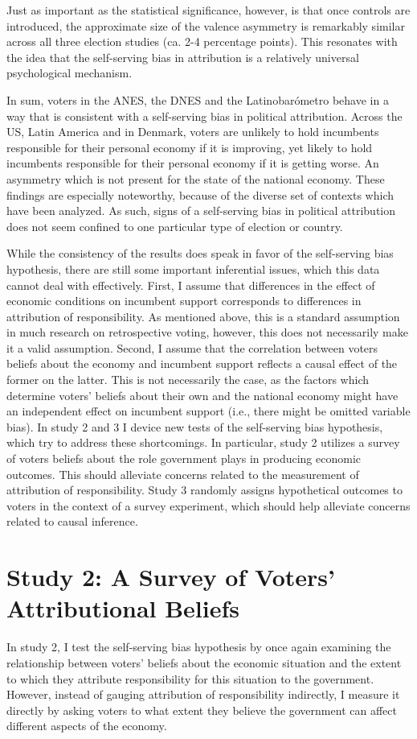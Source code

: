 \documentclass[a4paper,11pt]{article}
\begin{document}
	Just as important as the statistical significance, however, is that once controls are introduced, the approximate size of the valence asymmetry is remarkably similar across all three election studies (ca. 2-4 percentage points). This resonates with the idea that the self-serving bias in attribution is a relatively universal psychological mechanism.
	
	In sum, voters in the ANES, the DNES and the Latinobarómetro behave in a way that is consistent with a self-serving bias in political attribution. Across the US, Latin America and in Denmark, voters are unlikely to hold incumbents responsible for their personal economy if it is improving, yet likely to hold incumbents responsible for their personal economy if it is getting worse. An asymmetry which is not present for the state of the national economy. These findings are especially noteworthy, because of the diverse set of contexts which have been analyzed. As such, signs of a self-serving bias in political attribution does not seem confined to one particular type of election or country. 
	
	While the consistency of the results does speak in favor of the self-serving bias hypothesis, there are still some important inferential issues, which this data cannot deal with effectively. First, I assume that differences in the effect of economic conditions on incumbent support corresponds to differences in attribution of responsibility. As mentioned above, this is a standard assumption in much research on retrospective voting, however, this does not necessarily make it a valid assumption. Second, I assume that the correlation between voters beliefs about the economy and incumbent support reflects a causal effect of the former on the latter. This is not necessarily the case, as the factors which determine voters' beliefs about their own and the national economy might have an independent effect on incumbent support (i.e., there might be omitted variable bias). In study 2 and 3 I device new tests of the self-serving bias hypothesis, which try to address these shortcomings. In particular, study 2 utilizes a survey of voters beliefs about the role government plays in producing economic outcomes. This should alleviate concerns related to the measurement of attribution of responsibility. Study 3 randomly assigns hypothetical outcomes to voters in the context of a survey experiment, which should help alleviate concerns related to causal inference.
	
	\section{Study 2: A Survey of Voters' Attributional Beliefs}
	In study 2, I test the self-serving bias hypothesis by once again examining the relationship between voters' beliefs about the economic situation and the extent to which they attribute responsibility for this situation to the government. However, instead of gauging attribution of responsibility indirectly, I measure it directly by asking voters to what extent they believe the government can affect different aspects of the economy.
	
\end{document}
